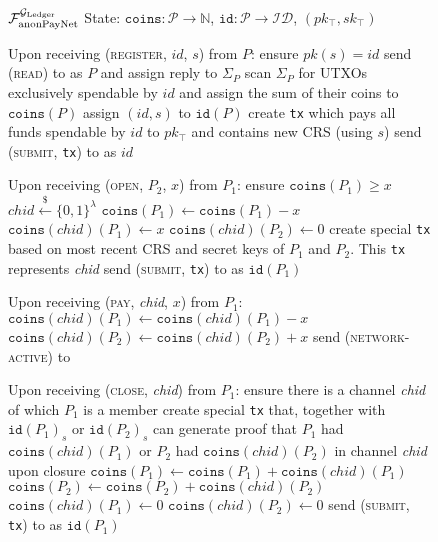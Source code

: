 \begin{figure}[H]
  \begin{systembox}{$\mathcal{F}_{\mathrm{anonPayNet}}^{\mathcal{G}_{\mathrm{Ledger}}}$}
    State: $\mathtt{coins} : \mathcal{P} \rightarrow \mathbb{N}$,
    $\mathtt{id} : \mathcal{P} \rightarrow \mathcal{ID}$, $(pk_{\top},
    sk_{\top})$
    \begin{algorithmic}[1]
      \State Upon receiving (\textsc{register}, $id$, $s$) from $P$:
      \Indent
        \State ensure $pk(s) = id$
        \State send (\textsc{read}) to \ledger as $P$ and assign reply to
        $\Sigma_P$
        \State scan $\Sigma_P$ for UTXOs exclusively spendable by $id$ and
        assign the sum of their coins to $\mathtt{coins}(P)$
        \State assign $(id, s)$ to $\mathtt{id}(P)$
        \State create \texttt{tx} which pays all funds spendable by $id$ to
        $pk_{\top}$ and contains new CRS (using $s$) 
        \State send (\textsc{submit}, \texttt{tx}) to \ledger as $id$
      \EndIndent
      \Statex

      \State Upon receiving (\textsc{open}, $P_2$, $x$) from $P_1$:
      \Indent
        \State ensure $\mathtt{coins}(P_1) \geq x$
        \State $\mathit{chid} \overset{\$}{\gets} \{0, 1\}^{\lambda}$
        \State $\mathtt{coins}(P_1) \gets \mathtt{coins}(P_1) - x$
        \State $\mathtt{coins}(\mathit{chid})(P_1) \gets x$
        \State $\mathtt{coins}(\mathit{chid})(P_2) \gets 0$
        \State create special \texttt{tx} based on most recent CRS and secret
        keys of $P_1$ and $P_2$. This \texttt{tx} represents \textit{chid}
        \State send (\textsc{submit}, \texttt{tx}) to \ledger as
        $\mathtt{id}(P_1)$
      \EndIndent
      \Statex

      \State Upon receiving (\textsc{pay}, \textit{chid}, $x$) from $P_1$:
      \Indent
          \State $\mathtt{coins}(\mathit{chid})(P_1) \gets
          \mathtt{coins}(\mathit{chid})(P_1) - x$
          \State $\mathtt{coins}(\mathit{chid})(P_2) \gets
          \mathtt{coins}(\mathit{chid})(P_2) + x$
        \EndIf
        \State send (\textsc{network-active}) to \adversary
      \EndIndent
      \Statex

      \State Upon receiving (\textsc{close}, \textit{chid}) from $P_1$:
      \Indent
        \State ensure there is a channel \textit{chid} of which $P_1$ is a
        member
        \State create special \texttt{tx} that, together with
        $\mathtt{id}(P_1)_s$ or $\mathtt{id}(P_2)_s$ can generate proof that
        $P_1$ had $\mathtt{coins}(\mathit{chid})(P_1)$ or $P_2$ had
        $\mathtt{coins}(\mathit{chid})(P_2)$ in channel \textit{chid} upon
        closure 
        \State $\mathtt{coins}(P_1) \gets \mathtt{coins}(P_1) +
        \mathtt{coins}(\mathit{chid})(P_1)$
        \State $\mathtt{coins}(P_2) \gets \mathtt{coins}(P_2) +
        \mathtt{coins}(\mathit{chid})(P_2)$
        \State $\mathtt{coins}(\mathit{chid})(P_1) \gets 0$
        \State $\mathtt{coins}(\mathit{chid})(P_2) \gets 0$
        \State send (\textsc{submit}, \texttt{tx}) to \ledger as
        $\mathtt{id}(P_1)$
      \EndIndent
      \Statex


\end{algorithmic}
\end{systembox}
\end{figure}
